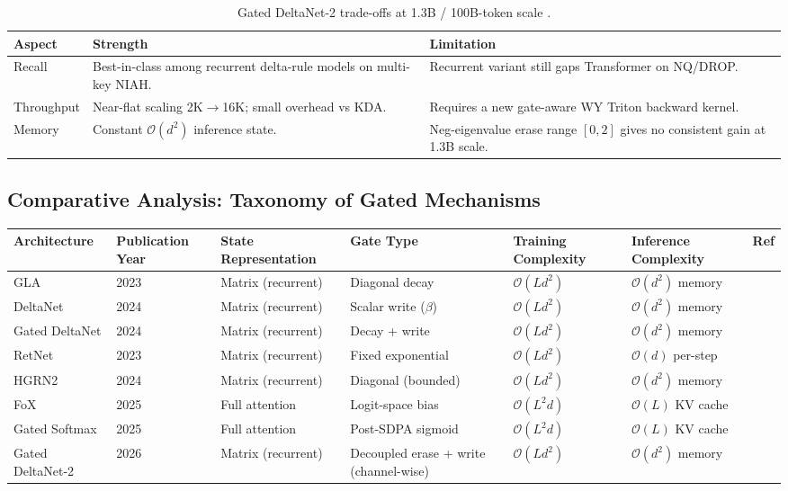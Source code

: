 \documentclass[11pt,a4paper]{article}
\begin{document}
\begin{table}[H]
\centering
\footnotesize
\begin{tabularx}{\linewidth}{lXX}
\toprule
\textbf{Aspect} & \textbf{Strength} & \textbf{Limitation} \\
\midrule
Recall & Best-in-class among recurrent delta-rule models on multi-key NIAH. & Recurrent variant still gaps Transformer on NQ/DROP. \\
Throughput & Near-flat scaling 2K$\to$16K; small overhead vs KDA. & Requires a new gate-aware WY Triton backward kernel. \\
Memory & Constant $\mathcal{O}(d^2)$ inference state. & Neg-eigenvalue erase range $[0,2]$ gives no consistent gain at 1.3B scale. \\
\bottomrule
\end{tabularx}
\caption{Gated DeltaNet-2 trade-offs at 1.3B / 100B-token scale \citep{hatamizadeh_gated_deltanet2_2026}.}
\label{tab:gated-deltanet2-tradeoffs}
\end{table}

\normalsize

\subsection{Comparative Analysis: Taxonomy of Gated Mechanisms}

\footnotesize
\begin{longtable}{p{1.8cm}p{1.7cm}p{1.8cm}p{1.6cm}p{2.0cm}p{2.4cm}p{1.3cm}}
\toprule
\textbf{Architecture} & \textbf{Publication Year} & \textbf{State Representation} & \textbf{Gate Type} & \textbf{Training Complexity} & \textbf{Inference Complexity} & \textbf{Ref} \\
\midrule
\endhead
GLA & 2023 & Matrix (recurrent) & Diagonal decay & $\mathcal{O}(Ld^2)$ & $\mathcal{O}(d^2)$ memory & \citep{yang_gla_2023} \\
DeltaNet & 2024 & Matrix (recurrent) & Scalar write ($\beta$) & $\mathcal{O}(Ld^2)$ & $\mathcal{O}(d^2)$ memory & \citep{yang_deltanet_2024} \\
Gated DeltaNet & 2024 & Matrix (recurrent) & Decay + write & $\mathcal{O}(Ld^2)$ & $\mathcal{O}(d^2)$ memory & \citep{yang_gated_deltanet_2024} \\
RetNet & 2023 & Matrix (recurrent) & Fixed exponential & $\mathcal{O}(Ld^2)$ & $\mathcal{O}(d)$ per-step & \citep{sun_retentive_2023} \\
HGRN2 & 2024 & Matrix (recurrent) & Diagonal (bounded) & $\mathcal{O}(Ld^2)$ & $\mathcal{O}(d^2)$ memory & \citep{qin_hgrn2_2024} \\
FoX & 2025 & Full attention & Logit-space bias & $\mathcal{O}(L^2d)$ & $\mathcal{O}(L)$ KV cache & \citep{lin_forgetting_transformer_2025} \\
Gated Softmax & 2025 & Full attention & Post-SDPA sigmoid & $\mathcal{O}(L^2d)$ & $\mathcal{O}(L)$ KV cache & \citep{qiu_gated_attention_2025} \\
Gated DeltaNet-2 & 2026 & Matrix (recurrent) & Decoupled erase + write (channel-wise) & $\mathcal{O}(Ld^2)$ & $\mathcal{O}(d^2)$ memory & \citep{hatamizadeh_gated_deltanet2_2026} \\
\bottomrule
\end{longtable}
\normalsize
\end{document}
